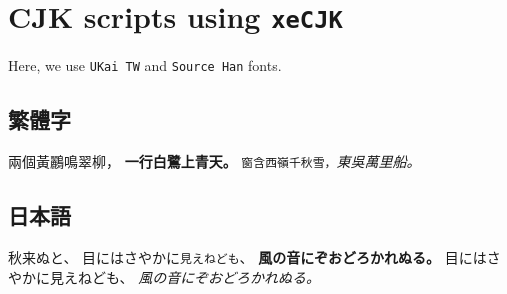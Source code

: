 \documentclass[12pt]{amsart}
\numberwithin{equation}{section} %
\begin{document}
\section{CJK scripts using \texttt{xeCJK}}
Here, we use \texttt{UKai TW} and \texttt{Source Han} fonts.
\subsection{繁體字}
兩個黃鸝\textsf{鳴翠柳，} \textbf{一行白鷺上青天。}
\texttt{窗含西嶺千秋雪，}\textit{東吳萬里船。}

{%
	\subsection{日本語}
	秋来ぬと、
	目にはさやかに\texttt{見えねども}、
	\textbf{風の音にぞおどろかれぬる。}
	目にはさやかに\textsf{見えねども}、
	\textit{風の音にぞおどろかれぬる。}
}


\printbibliography
\end{document}
